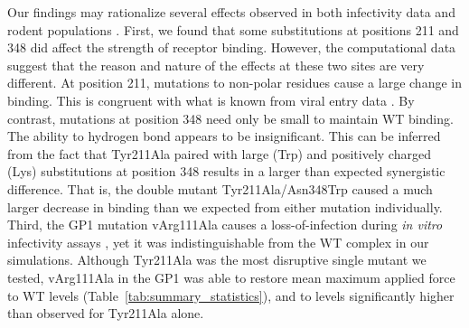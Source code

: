 \documentclass[12pt]{article} %
\providecommand{\DIFaddbegin}{} %
\providecommand{\DIFaddend}{} %
\providecommand{\DIFdelbegin}{} %
\providecommand{\DIFdelend}{} %
\begin{document}
Our findings may rationalize several effects observed in both infectivity data and rodent populations \DIFdelbegin %
\DIFdelend \DIFaddbegin \citep{Rad2008,Rad20111}\DIFaddend . First, we found that some substitutions at positions 211 and 348 did affect the strength of receptor binding. However, the computational data suggest that the reason and nature of the effects at these two sites are very different. At position 211, mutations to non-polar residues cause a large change in binding. This is congruent with what is known from viral entry data \DIFdelbegin %
\DIFdelend \DIFaddbegin \citep{Rad2008,Rad20111}\DIFaddend . By contrast, mutations at position 348 need only be small to maintain WT binding. The ability to hydrogen bond appears to be insignificant. This can be inferred from the fact that Tyr211Ala paired with large (Trp) and positively charged (Lys) substitutions at position 348 results in a larger than expected synergistic difference. That is, the double mutant Tyr211Ala/Asn348Trp caused a much larger decrease in binding than we expected from either mutation individually. Third, the GP1 mutation vArg111Ala causes a loss-of-infection during \textit{in vitro} infectivity assays \DIFdelbegin %
\DIFdelend \DIFaddbegin \citep{Rad20112}\DIFaddend , yet it was indistinguishable from the WT complex in our simulations. Although Tyr211Ala was the most disruptive single mutant we tested, vArg111Ala in the GP1 was able to restore mean maximum applied force to WT levels (Table~\ref{tab:summary_statistics}), and to levels significantly higher than observed for Tyr211Ala alone.
\end{document}
